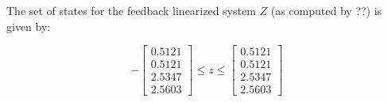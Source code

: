The set of states for the feedback linearized system $Z$ (as computed by ??) is given by:

\begin{equation}
 -\begin{bmatrix} 0.5121  \\ 0.5121  \\ 2.5347 \\ 2.5603 \end{bmatrix} \leq z \leq \begin{bmatrix} 0.5121  \\ 0.5121  \\ 2.5347 \\ 2.5603 \end{bmatrix}
\end{equation}